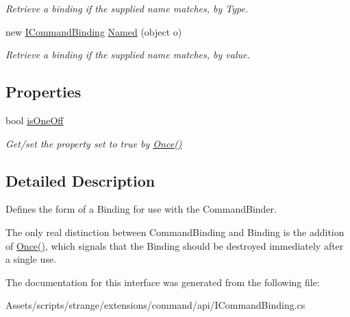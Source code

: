 \begin{DoxyCompactItemize}
\begin{DoxyCompactList}\small\item\em Retrieve a binding if the supplied name matches, by Type. \end{DoxyCompactList}\item 
\hypertarget{interfacestrange_1_1extensions_1_1command_1_1api_1_1_i_command_binding_a944ca3f289146a7eebe115dba2a9b2f5}{new \hyperlink{interfacestrange_1_1extensions_1_1command_1_1api_1_1_i_command_binding}{I\-Command\-Binding} \hyperlink{interfacestrange_1_1extensions_1_1command_1_1api_1_1_i_command_binding_a944ca3f289146a7eebe115dba2a9b2f5}{Named} (object o)}\label{interfacestrange_1_1extensions_1_1command_1_1api_1_1_i_command_binding_a944ca3f289146a7eebe115dba2a9b2f5}

\begin{DoxyCompactList}\small\item\em Retrieve a binding if the supplied name matches, by value. \end{DoxyCompactList}\end{DoxyCompactItemize}
\subsection*{Properties}
\begin{DoxyCompactItemize}
\item 
\hypertarget{interfacestrange_1_1extensions_1_1command_1_1api_1_1_i_command_binding_a624de4954de4f3517b1f4c6af11153ff}{bool \hyperlink{interfacestrange_1_1extensions_1_1command_1_1api_1_1_i_command_binding_a624de4954de4f3517b1f4c6af11153ff}{is\-One\-Off}}\label{interfacestrange_1_1extensions_1_1command_1_1api_1_1_i_command_binding_a624de4954de4f3517b1f4c6af11153ff}

\begin{DoxyCompactList}\small\item\em Get/set the property set to {\ttfamily true} by {\ttfamily \hyperlink{interfacestrange_1_1extensions_1_1command_1_1api_1_1_i_command_binding_a83a6c902c38775b55ba74e75807cd603}{Once()}} \end{DoxyCompactList}\end{DoxyCompactItemize}


\subsection{Detailed Description}
Defines the form of a Binding for use with the Command\-Binder. 

The only real distinction between Command\-Binding and Binding is the addition of {\ttfamily \hyperlink{interfacestrange_1_1extensions_1_1command_1_1api_1_1_i_command_binding_a83a6c902c38775b55ba74e75807cd603}{Once()}}, which signals that the Binding should be destroyed immediately after a single use. 

The documentation for this interface was generated from the following file\-:\begin{DoxyCompactItemize}
\item 
Assets/scripts/strange/extensions/command/api/I\-Command\-Binding.\-cs\end{DoxyCompactItemize}
